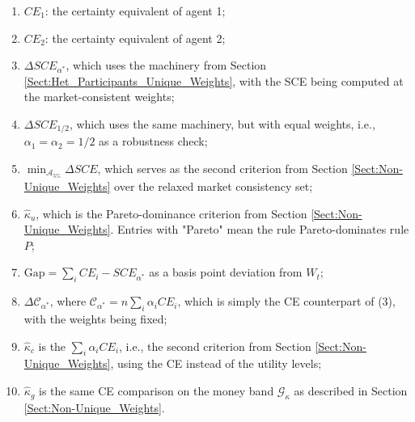 \begin{enumerate}[(1)]
    \item $CE_1$: the certainty equivalent of agent 1;
    \item $CE_2$: the certainty equivalent of agent 2;
    \item $\Delta SCE_{\alpha^*}$, which uses the machinery from Section \ref{Sect:Het_Participants_Unique_Weights}, with the SCE being computed at the market-consistent weights;
    \item $\Delta SCE_{1/2}$, which uses the same machinery, but with equal weights, i.e., $\alpha_1 = \alpha_2 = 1/2$ as a robustness check;
    \item $\min_{\mathcal{A}_{5\%}} \Delta SCE$, which serves as the second criterion from Section \ref{Sect:Non-Unique_Weights} over the relaxed market consistency set;
    \item $\hat{\kappa}_u$, which is the Pareto-dominance criterion from Section \ref{Sect:Non-Unique_Weights}. Entries with "Pareto" mean the rule Pareto-dominates rule $P$;
    \item $\text{Gap} = \sum_i CE_i - SCE_{\alpha^*}$ as a basis point deviation from $W_t$;
    \item $\Delta \mathcal{C}_{\alpha^*}$, where $\mathcal{C}_{\alpha^*} = n \sum_i \alpha_i CE_i$, which is simply the CE counterpart of (3), with the weights being fixed;
    \item $\hat{\kappa}_c$ is the $\sum_i \alpha_i CE_i$, i.e., the second criterion from Section \ref{Sect:Non-Unique_Weights}, using the CE instead of the utility levels;
    \item $\hat{\kappa}_g$ is the same CE comparison on the money band $\mathcal{G}_\kappa$ as described in Section \ref{Sect:Non-Unique_Weights}.
\end{enumerate}
